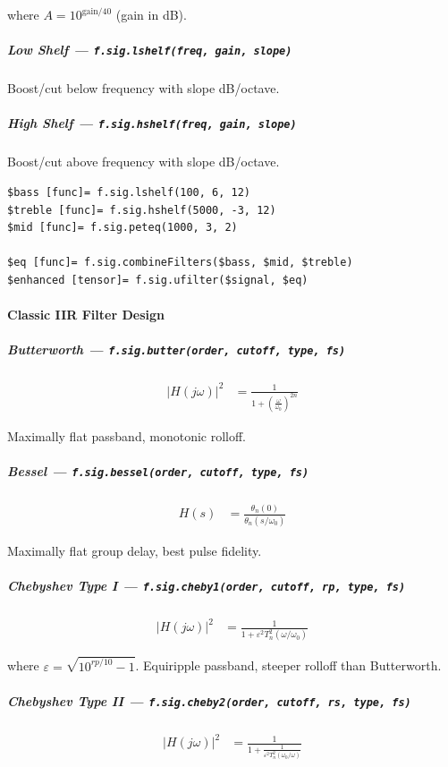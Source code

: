 where $A = 10^{\text{gain}/40}$ (gain in dB).

\subparagraph{Low Shelf --- \texttt{f.sig.lshelf(freq, gain, slope)}}
Boost/cut below frequency with slope dB/octave.

\subparagraph{High Shelf --- \texttt{f.sig.hshelf(freq, gain, slope)}}
Boost/cut above frequency with slope dB/octave.

\begin{verbatim}
$bass [func]= f.sig.lshelf(100, 6, 12)
$treble [func]= f.sig.hshelf(5000, -3, 12)
$mid [func]= f.sig.peteq(1000, 3, 2)

$eq [func]= f.sig.combineFilters($bass, $mid, $treble)
$enhanced [tensor]= f.sig.ufilter($signal, $eq)
\end{verbatim}

\paragraph{Classic IIR Filter Design}

\subparagraph{Butterworth --- \texttt{f.sig.butter(order, cutoff, type, fs)}}

\begin{align}
|H(j\omega)|^2 &= \frac{1}{1 + \left(\frac{\omega}{\omega_0}\right)^{2n}} \label{eq:sig-butter}
\end{align}

Maximally flat passband, monotonic rolloff.

\subparagraph{Bessel --- \texttt{f.sig.bessel(order, cutoff, type, fs)}}

\begin{align}
H(s) &= \frac{\theta_n(0)}{\theta_n(s/\omega_0)} \label{eq:sig-bessel}
\end{align}

Maximally flat group delay, best pulse fidelity.

\subparagraph{Chebyshev Type I --- \texttt{f.sig.cheby1(order, cutoff, rp, type, fs)}}

\begin{align}
|H(j\omega)|^2 &= \frac{1}{1 + \varepsilon^2 T_n^2(\omega/\omega_0)} \label{eq:sig-cheby1}
\end{align}

where $\varepsilon = \sqrt{10^{rp/10} - 1}$. Equiripple passband, steeper rolloff than Butterworth.

\subparagraph{Chebyshev Type II --- \texttt{f.sig.cheby2(order, cutoff, rs, type, fs)}}

\begin{align}
|H(j\omega)|^2 &= \frac{1}{1 + \frac{1}{\varepsilon^2 T_n^2(\omega_0/\omega)}} \label{eq:sig-cheby2}
\end{align}

